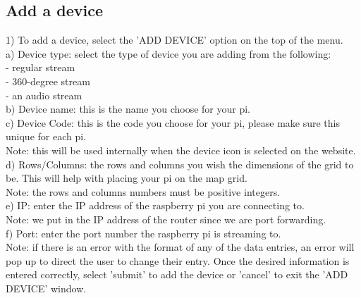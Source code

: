 \documentclass[onecolumn, draftclsnofoot,10pt, compsoc]{IEEEtran}
\begin{document}
\subsection{Add a device}
1) To add a device, select the 'ADD DEVICE' option on the top of the menu. \\
\hspace*{1cm} a) Device type: select the type of device you are adding from the following: \\
    \hspace*{2cm} - regular stream \\
    \hspace*{2cm} - 360-degree stream \\
    \hspace*{2cm} - an audio stream \\
\hspace*{1cm} b) Device name: this is the name you choose for your pi. \\ 
\hspace*{1cm} c) Device Code: this is the code you choose for your pi, please make sure this unique for each pi. \\
    \hspace*{2cm} Note: this will be used internally when the device icon is selected on the website. \\
\hspace*{1cm} d) Rows/Columns: the rows and columns you wish the dimensions of the grid to be. This will help with placing \hspace*{2cm } your pi on the map grid.\\
    \hspace*{2cm} Note: the rows and columns numbers must be positive integers.  \\
\hspace*{1cm} e) IP: enter the IP address of the raspberry pi you are connecting to. \\
\hspace*{2cm} Note: we put in the IP address of the router since we are port forwarding. \\
\hspace*{1cm} f) Port: enter the port number the raspberry pi is streaming to. \\
Note: if there is an error with the format of any of the data entries, an error will pop up to direct the user to change their entry.
Once the desired information is entered correctly, select 'submit' to add the device or 'cancel' to exit the 'ADD DEVICE' window. 
\end{document}
